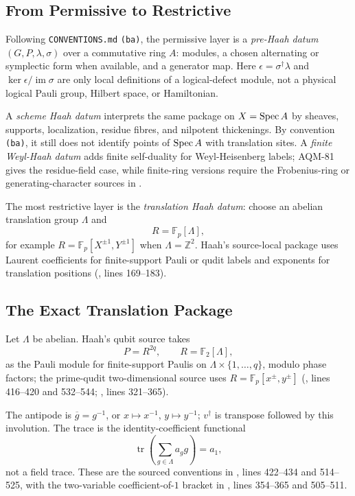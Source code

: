 \subsection{From Permissive to Restrictive}

Following \texttt{CONVENTIONS.md} \texttt{(ba)}, the permissive layer is a
\emph{pre-Haah datum} \((G,P,\lambda,\sigma)\) over a commutative ring \(A\):
modules, a chosen alternating or symplectic form when available, and a
generator map.  Here \(\epsilon=\sigma^\dagger\lambda\) and
\(\ker\epsilon/\operatorname{im}\sigma\) are only local definitions of a
logical-defect module, not a physical logical Pauli group, Hilbert space, or
Hamiltonian.

A \emph{scheme Haah datum} interprets the same package on \(X=\operatorname{Spec} A\) by
sheaves, supports, localization, residue fibres, and nilpotent thickenings.
By convention \texttt{(ba)}, it still does not identify points of \(\operatorname{Spec} A\)
with translation sites.  A \emph{finite Weyl-Haah datum} adds finite
self-duality for Weyl-Heisenberg labels; AQM-81 gives the residue-field case,
while finite-ring versions require the Frobenius-ring or generating-character
sources in .

The most restrictive layer is the \emph{translation Haah datum}: choose an
abelian translation group \(\Lambda\) and
\[
  R=\mathbb F_p[\Lambda],
\]
for example \(R=\mathbb F_p[X^{\pm1},Y^{\pm1}]\) when
\(\Lambda=\mathbb Z^2\).  Haah's source-local package uses Laurent
coefficients for finite-support Pauli or qudit labels and exponents for
translation positions
(,
lines 169--183).

\subsection{The Exact Translation Package}

Let \(\Lambda\) be abelian.  Haah's qubit source takes
\[
  P=R^{2q},\qquad R=\mathbb F_2[\Lambda],
\]
as the Pauli module for finite-support Paulis on
\(\Lambda\times\{1,\ldots,q\}\), modulo phase factors; the prime-qudit
two-dimensional source uses \(R=\mathbb F_p[x^\pm,y^\pm]\)
(,
lines 416--420 and 532--544;
,
lines 321--365).

The antipode is \(\overline{g}=g^{-1}\), or \(x\mapsto x^{-1}\),
\(y\mapsto y^{-1}\); \(v^\dagger\) is transpose followed by this involution.
The trace is the identity-coefficient functional
\[
  \operatorname{tr}\left(\sum_{g\in\Lambda}a_g g\right)=a_1,
\]
not a field trace.  These are the sourced conventions in
,
lines 422--434 and 514--525, with the two-variable coefficient-of-\(1\)
bracket in
,
lines 354--365 and 505--511.

